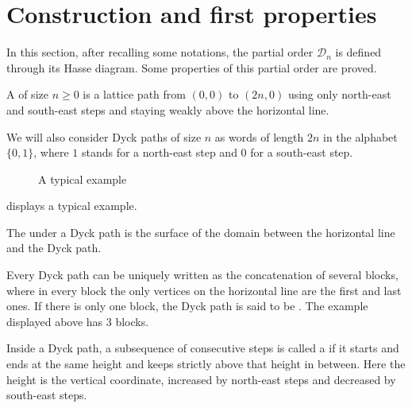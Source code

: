 \documentclass[10pt]{article}
\theoremstyle{definition}
\newcommand{\defin}[1]{\emph{\color{red}{#1}}}
\newcommand{\Dyck}{\mathscr{D}}
\begin{document}
\section{Construction and first properties}

In this section, after recalling some notations, the partial order
$\Dyck_n$ is defined through its Hasse diagram. Some properties of
this partial order are proved.

\label{sec1}
A \defin{Dyck path} of size $n \geq 0$ is a lattice path from $(0,0)$ to
$(2 n,0)$ using only north-east and south-east steps and staying weakly above
the horizontal line.

We will also consider Dyck paths of size $n$ as words of length $2 n$
in the alphabet $\{0,1\}$, where $1$ stands for a north-east step and
$0$ for a south-east step.

\begin{figure}[htb]\centering
{}
\caption{A typical example}
\label{typique}
\end{figure}
 displays a typical example.

The \defin{area} under a Dyck path is the surface of the domain between
the horizontal line and the Dyck path.

Every Dyck path can be uniquely written as the concatenation of
several blocks, where in every block the only vertices on the
horizontal line are the first and last ones. If there is only one
block, the Dyck path is said to be \defin{block-indecomposable}. The
example displayed above has $3$ blocks.

Inside a Dyck path, a subsequence of consecutive steps is called a
\defin{subpath} if it starts and ends at the same height and keeps
strictly above that height in between. Here the height is the
vertical coordinate, increased by north-east steps and decreased by
south-east steps.
\end{document}
